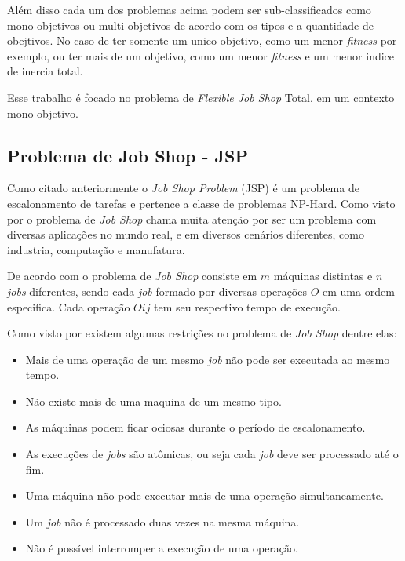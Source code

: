         Além disso cada um dos problemas acima podem ser sub-classificados como mono-objetivos ou multi-objetivos de acordo com os tipos e a quantidade de obejtivos. \newline
        No caso de ter somente um unico objetivo, como um menor \textit{fitness} por exemplo, ou ter mais de um objetivo, como um menor \textit{fitness} e um menor indice de inercia total.\newline

        Esse trabalho é focado no problema de \textit{Flexible Job Shop} Total, em um contexto mono-objetivo.


    \subsection{Problema de Job Shop - JSP}
            Como citado anteriormente o \textit{Job Shop Problem} (JSP) é um problema de escalonamento de tarefas e pertence a classe de problemas NP-Hard. Como visto por \cite{Cheng1996} o problema de \textit{Job Shop} chama muita atenção por ser um problema com diversas aplicações no mundo real, e em diversos cenários diferentes, como industria, computação e manufatura.\newline

            De acordo com \cite{Cheng1996} o problema de \textit{Job Shop} consiste em $m$ máquinas distintas e $n$ \textit{jobs} diferentes, sendo cada \textit{job} formado por diversas operações $O$ em uma ordem especifica. Cada operação $Oij$ tem seu respectivo tempo de execução.\newline

            Como visto por \cite{Bagchi1999} existem algumas restrições no problema de \textit{Job Shop} dentre elas:
            \begin{itemize}
                \item Mais de uma operação de um mesmo \textit{job} não pode ser executada ao mesmo tempo.
                \item Não existe mais de uma maquina de um mesmo tipo.
                \item As máquinas podem ficar ociosas durante o período de escalonamento.
                \item As execuções de \textit{jobs} são atômicas, ou seja cada \textit{job} deve ser processado até o fim.
                \item Uma máquina não pode executar mais de uma operação simultaneamente.
                \item Um \textit{job} não é processado duas vezes na mesma máquina.
                \item Não é possível interromper a execução de uma operação.
            \end{itemize}
        
